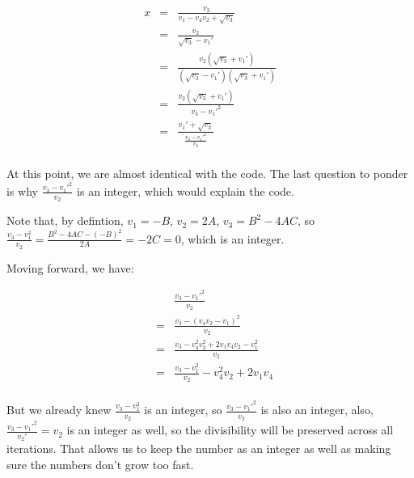 \documentclass{article}
\begin{document}
\begin{eqnarray*}
  x &=& \frac{v_2}{v_1 - v_4 v_2 + \sqrt{v_3}} \\
    &=& \frac{v_2}{\sqrt{v_3} - v_1'} \\
    &=& \frac{v_2(\sqrt{v_3} + v_1')}{(\sqrt{v_3} - v_1')(\sqrt{v_3} + v_1')} \\
    &=& \frac{v_2(\sqrt{v_3} + v_1')}{v_3 - v_1'^2} \\
    &=& \frac{v_1' + \sqrt{v_3}}{\frac{v_3 - v_1'^2}{v_2}} \\
\end{eqnarray*}

At this point, we are almost identical with the code. The last question to ponder is why $ \frac{v_3 - v_1'^2}{v_2} $ is an integer, which would explain the code.

Note that, by defintion, $ v_1 = -B $, $ v_2 = 2A $, $ v_3 = B^2 - 4AC $, so $ \frac{v_3 - v_1^2}{v_2} = \frac{B^2 - 4AC - (-B)^2}{2A} = -2C = 0 $, which is an integer.

Moving forward, we have:

\begin{eqnarray*}
  & & \frac{v_3 - v_1'^2}{v_2} \\
  &=& \frac{v_3 - (v_4 v_2 - v_1)^2}{v_2} \\
  &=& \frac{v_3 - v_4^2 v_2^2 + 2v_1 v_4 v_2 - v_1^2}{v_2} \\
  &=& \frac{v_3 - v_1^2}{v_2}  - v_4^2 v_2 + 2v_1 v_4 \\
\end{eqnarray*}

But we already knew $ \frac{v_3 - v_1^2}{v_2} $ is an integer, so $ \frac{v_3 - v_1'^2}{v_2} $ is also an integer, also, $ \frac{v_3 - v_1'^2}{v_2'} = v_2 $ is an integer as well, so the divisibility will be preserved across all iterations. That allows us to keep the number as an integer as well as making sure the numbers don't grow too fast.
\end{document}
